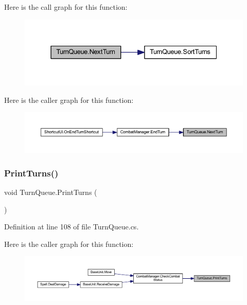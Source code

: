 Here is the call graph for this function\+:
\nopagebreak
\begin{figure}[H]
\begin{center}
\leavevmode
\includegraphics[width=331pt]{class_turn_queue_acae6f91ff8006307a04d4ee9362c1b7e_cgraph}
\end{center}
\end{figure}
Here is the caller graph for this function\+:
\nopagebreak
\begin{figure}[H]
\begin{center}
\leavevmode
\includegraphics[width=350pt]{class_turn_queue_acae6f91ff8006307a04d4ee9362c1b7e_icgraph}
\end{center}
\end{figure}
\mbox{\label{class_turn_queue_ae1c735b715ec963c76f0291cb9629338}} 
\subsubsection{\texorpdfstring{PrintTurns()}{PrintTurns()}}
{\footnotesize\ttfamily void Turn\+Queue.\+Print\+Turns (\begin{DoxyParamCaption}{ }\end{DoxyParamCaption})}



Definition at line 108 of file Turn\+Queue.\+cs.

Here is the caller graph for this function\+:
\nopagebreak
\begin{figure}[H]
\begin{center}
\leavevmode
\includegraphics[width=350pt]{class_turn_queue_ae1c735b715ec963c76f0291cb9629338_icgraph}
\end{center}
\end{figure}
\mbox{\label{class_turn_queue_af6ee9af337f42a417812f4bc96f8d600}} 
